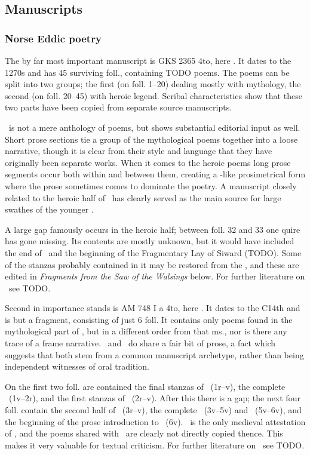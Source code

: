   \subsection{Manuscripts}

    \subsubsection{Norse Eddic poetry}

    The by far most important manuscript is GKS 2365 4to, here \Regius. It dates to the 1270s and has 45 surviving foll., containing TODO poems.  The poems can be split into two groups; the first (on foll. 1–20) dealing mostly with mythology, the second (on foll. 20–45) with heroic legend.  Scribal characteristics show that these two parts have been copied from separate source manuscripts.

    \Regius\ is not a mere anthology of poems, but shows substantial editorial input as well.  Short prose sections tie a group of the mythological poems together into a loose narrative, though it is clear from their style and language that they have originally been separate works.  When it comes to the heroic poems long prose segments occur both within and between them, creating a -like prosimetrical form where the prose sometimes comes to dominate the poetry.  A manuscript closely related to the heroic half of \Regius\ has clearly served as the main source for large swathes of the younger \VolsungaSaga.

    A large gap famously occurs in the heroic half; between foll. 32 and 33 one quire has gone missing.  Its contents are mostly unknown, but it would have included the end of \Sigrdrifumal\ and the beginning of the Fragmentary Lay of Siward (TODO).  Some of the stanzas probably contained in it may be restored from the \VolsungaSaga, and these are edited in \emph{Fragments from the Saw of the Walsings} below.  For further literature on \Regius\ see TODO.


    Second in importance stands is AM 748 I a 4to, here \AM.  It dates to the C14th and is but a fragment, consisting of just 6 foll.  It contains only poems found in the mythological part of \Regius, but in a different order from that ms., nor is there any trace of a frame narrative.  \Regius\ and \AM\ do share a fair bit of prose, a fact which suggests that both stem from a common manuscript archetype, rather than being independent witnesses of oral tradition.

    On the first two foll. are contained the final stanzas of \Harbardsljod\ (1r–v), the complete \Baldrsdraumar\ (1v–2r), and the first stanzas of \Skirnismal\ (2r–v).  After this there is a gap; the next four foll. contain the second half of \Vafthrudnismal\ (3r–v), the complete \Grimnismal\ (3v–5v) and \Hymiskvida\ (5v–6v), and the beginning of the prose introduction to \Volundarkvida\ (6v).  \AM\ is the only medieval attestation of \Baldrsdraumar, and the poems shared with \Regius\ are clearly not directly copied thence.  This makes it very valuable for textual criticism.  For further literature on \AM\ see TODO.


